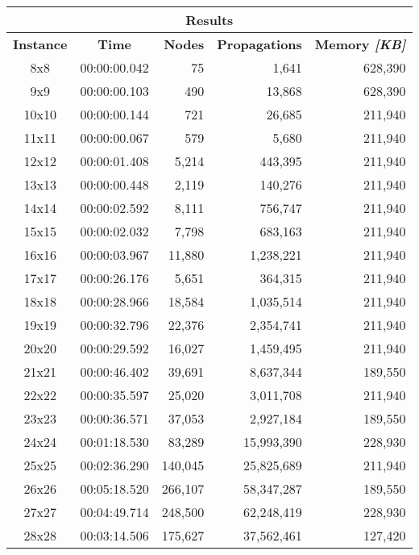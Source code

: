 
\begin{center}
    \begin{tabular}{|c|c|r|r|r|}
        \hline
        \multicolumn{5}{|c|}{\textbf{Results}} \\
        \hline
        \textbf{Instance} & \textbf{Time} & \textbf{Nodes} & \textbf{Propagations} & \textbf{Memory \textit{[KB]}} \\
        
        \hline
		8x8 & 00:00:00.042 & 75 & 1,641 & 628,390 \\ \hline
		9x9 & 00:00:00.103 & 490 & 13,868 & 628,390 \\ \hline
		10x10 & 00:00:00.144 & 721 & 26,685 & 211,940 \\ \hline
		11x11 & 00:00:00.067 & 579 & 5,680 & 211,940 \\ \hline
		12x12 & 00:00:01.408 & 5,214 & 443,395 & 211,940 \\ \hline
		13x13 & 00:00:00.448 & 2,119 & 140,276 & 211,940 \\ \hline
		14x14 & 00:00:02.592 & 8,111 & 756,747 & 211,940 \\ \hline
		15x15 & 00:00:02.032 & 7,798 & 683,163 & 211,940 \\ \hline
		16x16 & 00:00:03.967 & 11,880 & 1,238,221 & 211,940 \\ \hline
		17x17 & 00:00:26.176 & 5,651 & 364,315 & 211,940 \\ \hline
		18x18 & 00:00:28.966 & 18,584 & 1,035,514 & 211,940 \\ \hline
		19x19 & 00:00:32.796 & 22,376 & 2,354,741 & 211,940 \\ \hline
		20x20 & 00:00:29.592 & 16,027 & 1,459,495 & 211,940 \\ \hline
		21x21 & 00:00:46.402 & 39,691 & 8,637,344 & 189,550 \\ \hline
		22x22 & 00:00:35.597 & 25,020 & 3,011,708 & 211,940 \\ \hline
		23x23 & 00:00:36.571 & 37,053 & 2,927,184 & 189,550 \\ \hline
		24x24 & 00:01:18.530 & 83,289 & 15,993,390 & 228,930 \\ \hline
		25x25 & 00:02:36.290 & 140,045 & 25,825,689 & 211,940 \\ \hline
		26x26 & 00:05:18.520 & 266,107 & 58,347,287 & 189,550 \\ \hline
		27x27 & 00:04:49.714 & 248,500 & 62,248,419 & 228,930 \\ \hline
		28x28 & 00:03:14.506 & 175,627 & 37,562,461 & 127,420 \\ \hline

\end{tabular}
\end{center}
